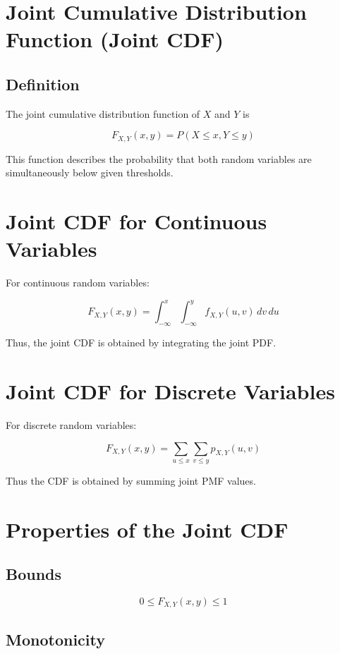 \documentclass[12pt]{article}
\begin{document}
\section{Joint Cumulative Distribution Function (Joint CDF)}

\subsection{Definition}

The joint cumulative distribution function of $X$ and $Y$ is

\[
F_{X,Y}(x,y) = P(X \le x, Y \le y)
\]

This function describes the probability that both random variables are simultaneously below given thresholds.

\section{Joint CDF for Continuous Variables}

For continuous random variables:

\[
F_{X,Y}(x,y)
=
\int_{-\infty}^{x} \int_{-\infty}^{y}
f_{X,Y}(u,v)\,dv\,du
\]

Thus, the joint CDF is obtained by integrating the joint PDF.

\section{Joint CDF for Discrete Variables}

For discrete random variables:

\[
F_{X,Y}(x,y)
=
\sum_{u\le x}\sum_{v\le y} p_{X,Y}(u,v)
\]

Thus the CDF is obtained by summing joint PMF values.

\section{Properties of the Joint CDF}

\subsection{Bounds}

\[
0 \le F_{X,Y}(x,y) \le 1
\]

\subsection{Monotonicity}
\end{document}
